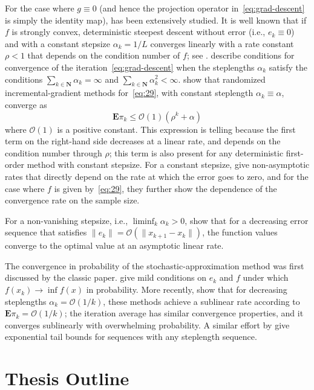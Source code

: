 For the case where $g\equiv0$ (and hence the projection operator
in~\eqref{eq:grad-descent} is simply the identity map), has been extensively
studied. It is well known that if $f$ is strongly convex,
deterministic steepest descent without error (i.e., $e_k\equiv0$) and
with a constant stepsize $\alpha_k = 1/L$ converges linearly with a
rate constant $\rho<1$ that depends on the condition number of $f$;
see \cite[section~8.6]{luenberger2008linear}. \cite{BT:2000} describe conditions for convergence of the
iteration~\eqref{eq:grad-descent} when the steplengths $\alpha_k$ satisfy the
conditions $\sum_{k\in\mathbf{N}} \alpha_k = \infty$ and
$\sum_{k\in\mathbf{N}} \alpha_k^2 < \infty$. \cite{NedBer:2000} show that randomized incremental-gradient
methods for~\eqref{eq:29}, with constant steplength
$\alpha_k\equiv\alpha$, converge as 
\[ \mathbf{E}\pi_k \le \mathcal{O}(1)(\rho^k +
\alpha) \] 
where $\mathcal{O}(1)$ is a positive constant. This expression is
telling  because the first term on the right-hand side decreases at a
linear rate, and depends on the condition number through $\rho$; this
term is also present for any deterministic first-order method with
constant stepsize. For a constant stepsize, \cite{friedlander2012hybrid} give non-asymptotic rates that directly
depend on the rate at which the error goes to zero, and for the case
where $f$ is given by~\eqref{eq:29}, they further show the dependence
of the convergence rate on the sample size.


For a non-vanishing stepsize, i.e., $\liminf_{k}\alpha_k>0$,
\cite{luo1993error} show that for a decreasing error sequence that satisfies
$\|e_{k}\| = \mathcal{O} ( \|x_{k+1}-x_{k}\|)$, the function values converge to the
optimal value at an asymptotic linear rate.

The convergence in probability of the stochastic-approximation method
was first discussed by the classic 
\cite{robbins1951stochastic} paper. \cite{BT:2000} give mild conditions on $e_{k}$ and $f$
under which $f(x_{k}) \to \inf f(x)$ in probability. More recently,
\cite{nemirovski2009robust}
show that for decreasing steplengths $\alpha_k = \mathcal{O}(1/k)$, these
methods achieve a sublinear rate according to $\mathbf{E}\pi_k =
\mathcal{O}(1/k)$; the iteration average has similar convergence
properties, and it converges sublinearly with overwhelming
probability. A similar effort by \cite{nesterov2008confidence}
give exponential tail bounds for sequences with any steplength
sequence.


\section{Thesis Outline}